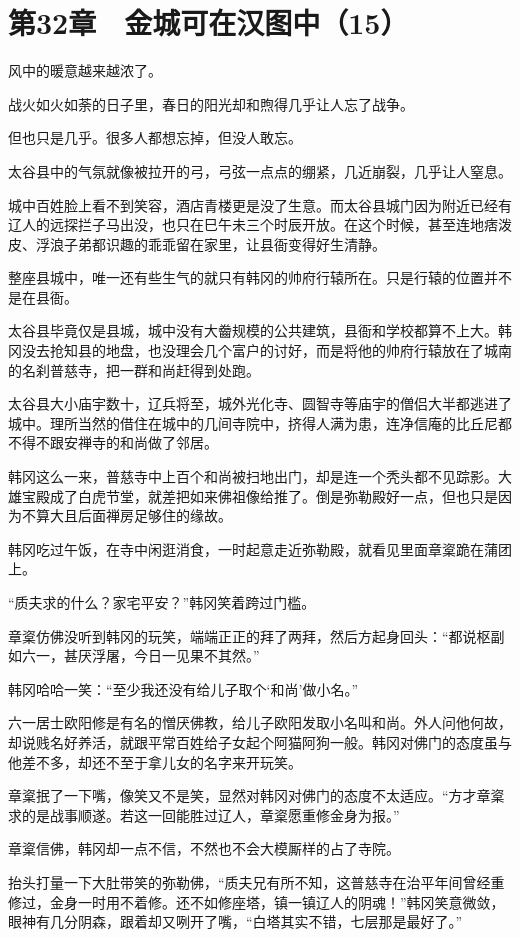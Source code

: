 \section{第32章　金城可在汉图中（15）}

风中的暖意越来越浓了。

战火如火如荼的日子里，春日的阳光却和煦得几乎让人忘了战争。

但也只是几乎。很多人都想忘掉，但没人敢忘。

太谷县中的气氛就像被拉开的弓，弓弦一点点的绷紧，几近崩裂，几乎让人窒息。

城中百姓脸上看不到笑容，酒店青楼更是没了生意。而太谷县城门因为附近已经有辽人的远探拦子马出没，也只在巳午未三个时辰开放。在这个时候，甚至连地痞泼皮、浮浪子弟都识趣的乖乖留在家里，让县衙变得好生清静。

整座县城中，唯一还有些生气的就只有韩冈的帅府行辕所在。只是行辕的位置并不是在县衙。

太谷县毕竟仅是县城，城中没有大齤规模的公共建筑，县衙和学校都算不上大。韩冈没去抢知县的地盘，也没理会几个富户的讨好，而是将他的帅府行辕放在了城南的名刹普慈寺，把一群和尚赶得到处跑。

太谷县大小庙宇数十，辽兵将至，城外光化寺、圆智寺等庙宇的僧侣大半都逃进了城中。理所当然的借住在城中的几间寺院中，挤得人满为患，连净信庵的比丘尼都不得不跟安禅寺的和尚做了邻居。

韩冈这么一来，普慈寺中上百个和尚被扫地出门，却是连一个秃头都不见踪影。大雄宝殿成了白虎节堂，就差把如来佛祖像给推了。倒是弥勒殿好一点，但也只是因为不算大且后面禅房足够住的缘故。

韩冈吃过午饭，在寺中闲逛消食，一时起意走近弥勒殿，就看见里面章楶跪在蒲团上。

“质夫求的什么？家宅平安？”韩冈笑着跨过门槛。

章楶仿佛没听到韩冈的玩笑，端端正正的拜了两拜，然后方起身回头：“都说枢副如六一，甚厌浮屠，今日一见果不其然。”

韩冈哈哈一笑：“至少我还没有给儿子取个‘和尚’做小名。”

六一居士欧阳修是有名的憎厌佛教，给儿子欧阳发取小名叫和尚。外人问他何故，却说贱名好养活，就跟平常百姓给子女起个阿猫阿狗一般。韩冈对佛门的态度虽与他差不多，却还不至于拿儿女的名字来开玩笑。

章楶抿了一下嘴，像笑又不是笑，显然对韩冈对佛门的态度不太适应。“方才章楶求的是战事顺遂。若这一回能胜过辽人，章楶愿重修金身为报。”

章楶信佛，韩冈却一点不信，不然也不会大模厮样的占了寺院。

抬头打量一下大肚带笑的弥勒佛，“质夫兄有所不知，这普慈寺在治平年间曾经重修过，金身一时用不着修。还不如修座塔，镇一镇辽人的阴魂！”韩冈笑意微敛，眼神有几分阴森，跟着却又咧开了嘴，“白塔其实不错，七层那是最好了。”

